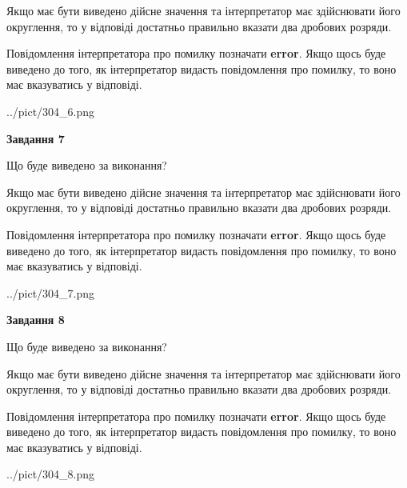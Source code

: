 \documentclass[12pt, ukrainian]{article}
\begin{document}
{\begin {Large}
Якщо має бути виведено дійсне значення та інтерпретатор має здійснювати його округлення, 
то у відповіді достатньо правильно вказати два дробових розряди.

Повідомлення інтерпретатора про помилку позначати \textbf{error}.
Якщо щось буде виведено до того, як інтерпретатор видасть повідомлення про помилку, 
то воно має вказуватись у відповіді. \par

\begin{center}
	{../pict/304_6.png}
\end{center}
\newpage

{\begin {center}\textbf{Завдання 7}\end {center}}\par
Що буде виведено за виконання? \par

Якщо має бути виведено дійсне значення та інтерпретатор має здійснювати його округлення, 
то у відповіді достатньо правильно вказати два дробових розряди.

Повідомлення інтерпретатора про помилку позначати \textbf{error}.
Якщо щось буде виведено до того, як інтерпретатор видасть повідомлення про помилку, 
то воно має вказуватись у відповіді. \par

\begin{center}
	{../pict/304_7.png}
\end{center}
\newpage

{\begin {center}\textbf{Завдання 8}\end {center}}\par
Що буде виведено за виконання? \par

Якщо має бути виведено дійсне значення та інтерпретатор має здійснювати його округлення, 
то у відповіді достатньо правильно вказати два дробових розряди.

Повідомлення інтерпретатора про помилку позначати \textbf{error}.
Якщо щось буде виведено до того, як інтерпретатор видасть повідомлення про помилку, 
то воно має вказуватись у відповіді. \par

\begin{center}
	{../pict/304_8.png}
\end{center}
\newpage


\end{Large}}
\end{document}
